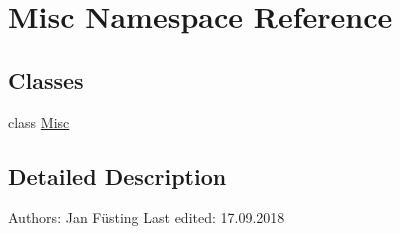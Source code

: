 \hypertarget{namespace_misc}{}\section{Misc Namespace Reference}
\label{namespace_misc}
\subsection*{Classes}
\begin{DoxyCompactItemize}
\item 
class \mbox{\hyperlink{class_misc_1_1_misc}{Misc}}
\end{DoxyCompactItemize}


\subsection{Detailed Description}
\begin{DoxyVerb}Authors:        Jan Füsting
Last edited:    17.09.2018
\end{DoxyVerb}
 
